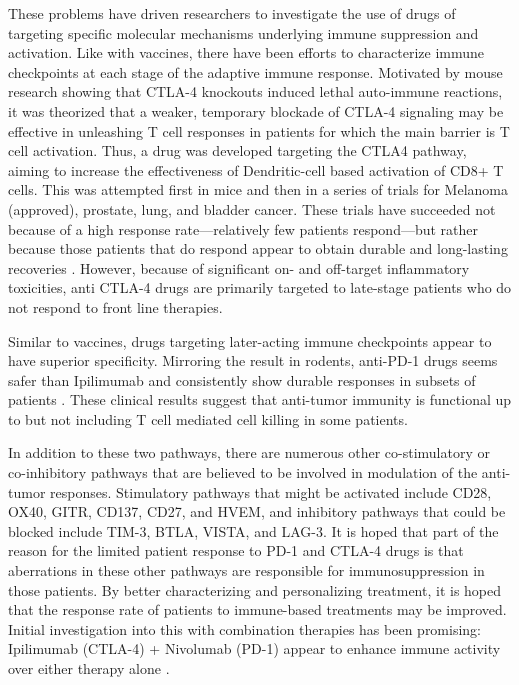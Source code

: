 These problems have driven researchers to investigate the use of drugs of targeting specific molecular mechanisms underlying immune suppression and activation. 
Like with vaccines, there have been efforts to characterize immune checkpoints at each stage of the adaptive immune response. 
Motivated by mouse research showing that CTLA-4 knockouts induced lethal auto-immune reactions, it was theorized that a weaker, temporary blockade of CTLA-4 signaling may be effective in unleashing T cell responses in patients for which the main barrier is T cell activation. 
Thus, a drug was developed targeting the CTLA4 pathway, aiming to increase the effectiveness of Dendritic-cell based activation of CD8+ T cells. 
This was attempted first in mice and then in a series of trials for Melanoma (approved), prostate, lung, and bladder cancer. %
These trials have succeeded not because of a high response rate---relatively few patients respond---but rather because those patients that do respond appear to obtain durable and long-lasting recoveries \citep{Robert2011,Hodi2010}.
However, because of significant on- and off-target inflammatory toxicities, anti CTLA-4 drugs are primarily targeted to late-stage patients who do not respond to front line therapies. 

Similar to vaccines, drugs targeting later-acting immune checkpoints appear to have superior specificity. 
Mirroring the result in rodents, anti-PD-1 drugs seems safer than Ipilimumab \citep{Brahmer2010} and consistently show durable responses in subsets of patients \citep{Hamid2013,McDermott2014}. 
These clinical results suggest that anti-tumor immunity is functional up to but not including T cell mediated cell killing in some patients. %

In addition to these two pathways, there are numerous other co-stimulatory or co-inhibitory pathways that are believed to be involved in modulation of the anti-tumor responses. 
Stimulatory pathways that might be activated include CD28, OX40, GITR, CD137, CD27, and HVEM, and inhibitory pathways that could be blocked include TIM-3, BTLA, VISTA, and LAG-3. 
It is hoped that part of the reason for the limited patient response to PD-1 and CTLA-4 drugs is that aberrations in these other pathways are responsible for immunosuppression in those patients. 
By better characterizing and personalizing treatment, it is hoped that the response rate of patients to immune-based treatments may be improved. 
Initial investigation into this with combination therapies has been promising: Ipilimumab (CTLA-4) + Nivolumab (PD-1) appear to enhance immune activity over either therapy alone \citep{Wolchok2013}.


